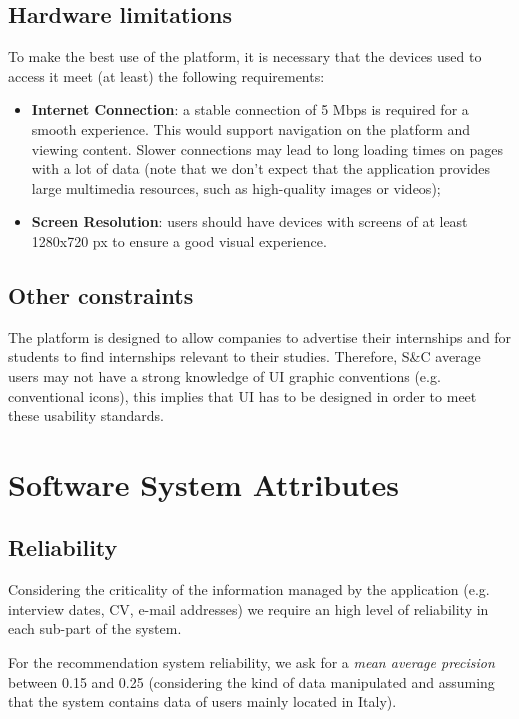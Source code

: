 		\subsection{Hardware limitations}
		
			To make the best use of the platform, it is necessary that the devices used to access it meet (at least) the following requirements:
			
			\begin{itemize}
				\item\textbf{Internet Connection}: a stable connection of 5 Mbps is required for a smooth experience. This would support navigation on the platform and viewing content. Slower connections may lead to long loading times on pages with a lot of data (note that we don't expect that the application provides large multimedia resources, such as high-quality images or videos);
				\item \textbf{Screen Resolution}: users should have devices with screens of at least 1280x720 px to ensure a good visual experience.
			\end{itemize}
			
		\subsection{Other constraints}
			The platform is designed to allow companies to advertise their internships and for students to find internships relevant to their studies. Therefore, S\&C average users may not have a strong knowledge of UI graphic conventions (e.g. conventional icons), this implies that UI has to be designed in order to meet these usability standards.
	\section{Software System Attributes}
		\subsection{Reliability}
			Considering the criticality of the information managed by the application (e.g. interview dates, CV, e-mail addresses) we require an high level of reliability in each sub-part of the system.
			
			For the recommendation system reliability, we ask for a \emph{mean average precision} between 0.15 and 0.25 (considering the kind of data manipulated and assuming that the system contains data of users mainly located in Italy).
